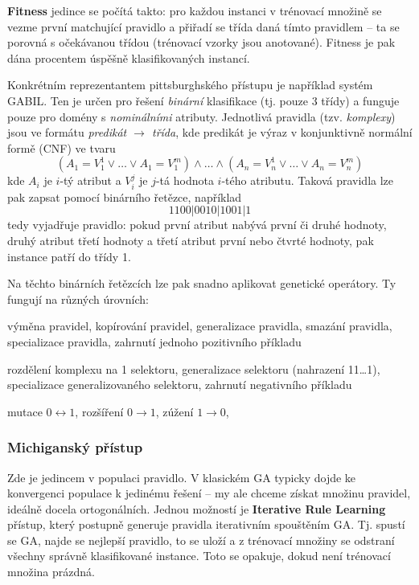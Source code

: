 \textbf{Fitness} jedince se počítá takto: pro každou instanci v trénovací množině se vezme první matchující pravidlo a přiřadí se třída daná tímto pravidlem -- ta se porovná s očekávanou třídou (trénovací vzorky jsou anotované). Fitness je pak dána procentem úspěšně klasifikovaných instancí.

Konkrétním reprezentantem pittsburghského přístupu je například systém GABIL. Ten je určen pro řešení \textit{binární} klasifikace (tj. pouze 3 třídy) a funguje pouze pro domény s \textit{nominálními} atributy. Jednotlivá pravidla (tzv. \textit{komplexy}) jsou ve formátu \textit{predikát $\rightarrow$ třída}, kde predikát je výraz v konjunktivně normální formě (CNF) ve tvaru
$$(A_1 = V_1^1 \lor \dots \lor A_1 = V_1^m) \land \dots \land (A_n = V_n^1 \lor \dots \lor A_n = V_n^m)$$
kde $A_i$ je $i$-tý atribut a $V_i^j$ je $j$-tá hodnota $i$-tého atributu. Taková pravidla lze pak zapsat pomocí binárního řetězce, například 
$$1100|0010|1001|1$$
tedy vyjadřuje pravidlo: pokud první atribut nabývá první či druhé hodnoty, druhý atribut třetí hodnoty a třetí atribut první nebo čtvrté hodnoty, pak instance patří do třídy 1. 

Na těchto binárních řetězcích lze pak snadno aplikovat genetické operátory. Ty fungují na různých úrovních:
\begin{description}
	\leftskip 40pt
	\setlength{\itemsep}{0pt}
	\item[na úrovni jedince (množiny pravidel)] výměna pravidel, kopírování pravidel, generalizace pravidla, smazání pravidla, specializace pravidla, zahrnutí jednoho pozitivního příkladu
	\item[na úrovni komplexů] rozdělení komplexu na 1 selektoru, generalizace selektoru (nahrazení 11\dots1), specializace
	generalizovaného selektoru, zahrnutí negativního příkladu
	\item[na selektorech] mutace $0 \leftrightarrow 1$, rozšíření $0 \rightarrow 1$, zúžení $1 \rightarrow 0$,
\end{description}

\subsubsection{Michiganský přístup}
Zde je jedincem v populaci pravidlo. V klasickém GA typicky dojde ke konvergenci populace k jedinému řešení -- my ale chceme získat množinu pravidel, ideálně docela ortogonálních. Jednou možností je \textbf{Iterative Rule Learning} přístup, který postupně generuje pravidla iterativním spouštěním GA. Tj. spustí se GA, najde se nejlepší pravidlo, to se uloží a z trénovací množiny se odstraní všechny správně klasifikované instance. Toto se opakuje, dokud není trénovací množina prázdná.

